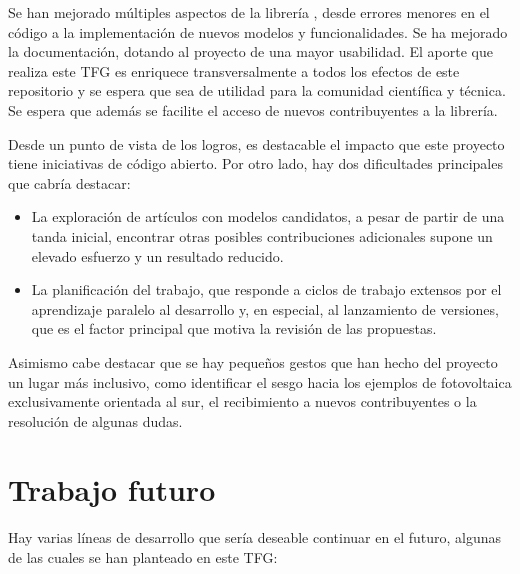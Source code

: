 Se han mejorado múltiples aspectos de la librería \pvlibpy, desde errores menores en el código a la implementación de nuevos modelos y funcionalidades. Se ha mejorado la documentación, dotando al proyecto de una mayor usabilidad. El aporte que realiza este TFG es enriquece transversalmente a todos los efectos de este repositorio y se espera que sea de utilidad para la comunidad científica y técnica. Se espera que además se facilite el acceso de nuevos contribuyentes a la librería.

Desde un punto de vista de los logros, es destacable el impacto que este proyecto tiene iniciativas de código abierto. Por otro lado, hay dos dificultades principales que cabría destacar:

\begin{itemize}
    \item La exploración de artículos con modelos candidatos, a pesar de partir de una tanda inicial, encontrar otras posibles contribuciones adicionales supone un elevado esfuerzo y un resultado reducido.
    \item La planificación del trabajo, que responde a ciclos de trabajo extensos por el aprendizaje paralelo al desarrollo y, en especial, al lanzamiento de versiones, que es el factor principal que motiva la revisión de las propuestas.
\end{itemize}

Asimismo cabe destacar que se hay pequeños gestos que han hecho del proyecto un lugar más inclusivo, como identificar el sesgo hacia los ejemplos de fotovoltaica exclusivamente orientada al sur, el recibimiento a nuevos contribuyentes o la resolución de algunas dudas.


\section{Trabajo futuro} \label{sct:resultados:trabajofuturo}

Hay varias líneas de desarrollo que sería deseable continuar en el futuro, algunas de las cuales se han planteado en este TFG:

